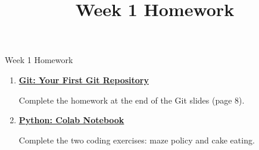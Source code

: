 \newcommand{\CourseTemplatePath}{../../../../../templates/slides/}

\title[Week 1 homework]{Week 1 Homework}

\begin{frame}{Week 1 Homework}
\begin{enumerate}
\item \href{https://yaolangzhong.github.io/U_Tokyo_Comp_Econ_Course/downloads/week_01/lab/Introduction_to_Git.pdf\#page=8}{\textbf{Git: Your First Git Repository}}
\par\smallskip
Complete the homework at the end of the Git slides (page 8).
\vspace{6mm}
\item \href{https://colab.research.google.com/github/YaolangZhong/U_Tokyo_Comp_Econ_Course/blob/main/weeks/week_01/lab/starter/markov_processes.ipynb}{\textbf{Python: Colab Notebook}}
\par\smallskip
Complete the two coding exercises: maze policy and cake eating.
\end{enumerate}
\end{frame}

